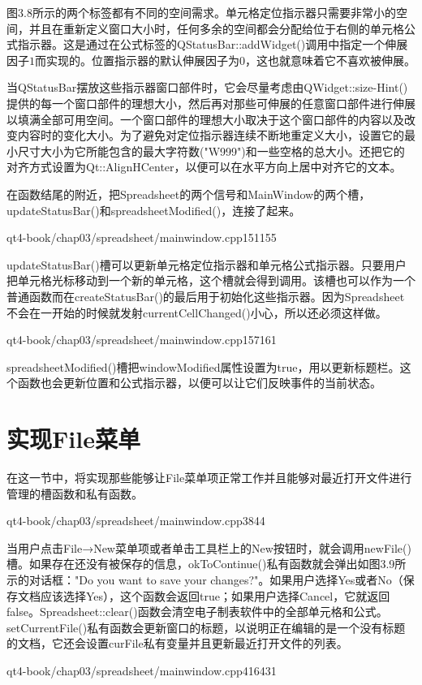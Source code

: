 \documentclass[11pt,oneside]{book}
\begin{document}
\begin{common-format}
图3.8所示的两个标签都有不同的空间需求。单元格定位指示器只需要非常小的空间，并且在重新定义窗口大小时，任何多余的空间都会分配给位于右侧的单元格公式指示器。这是通过在公式标签的QStatusBar::addWidget()调用中指定一个伸展因子$ 1 $而实现的。位置指示器的默认伸展因子为$ 0 $，这也就意味着它不喜欢被伸展。

当QStatusBar摆放这些指示器窗口部件时，它会尽量考虑由QWidget::size-Hint()提供的每一个窗口部件的理想大小，然后再对那些可伸展的任意窗口部件进行伸展以填满全部可用空间。一个窗口部件的理想大小取决于这个窗口部件的内容以及改变内容时的变化大小。为了避免对定位指示器连续不断地重定义大小，设置它的最小尺寸大小为它所能包含的最大字符数("W999")和一些空格的总大小。还把它的对齐方式设置为Qt::AlignHCenter，以便可以在水平方向上居中对齐它的文本。

在函数结尾的附近，把Spreadsheet的两个信号和MainWindow的两个槽，updateStatusBar()和spreadsheetModified()，连接了起来。
\begin{cppline}{qt4-book/chap03/spreadsheet/mainwindow.cpp}{151}{155}
\end{cppline}

updateStatusBar()槽可以更新单元格定位指示器和单元格公式指示器。只要用户把单元格光标移动到一个新的单元格，这个槽就会得到调用。该槽也可以作为一个普通函数而在createStatusBar()的最后用于初始化这些指示器。因为Spreadsheet不会在一开始的时候就发射currentCellChanged()小心，所以还必须这样做。
\begin{cppline}{qt4-book/chap03/spreadsheet/mainwindow.cpp}{157}{161}
\end{cppline}

spreadsheetModified()槽把windowModified属性设置为true，用以更新标题栏。这个函数也会更新位置和公式指示器，以便可以让它们反映事件的当前状态。

\section{实现File菜单}
在这一节中，将实现那些能够让File菜单项正常工作并且能够对最近打开文件进行管理的槽函数和私有函数。
\begin{cppline}{qt4-book/chap03/spreadsheet/mainwindow.cpp}{38}{44}
\end{cppline}

当用户点击File→New菜单项或者单击工具栏上的New按钮时，就会调用newFile()槽。如果存在还没有被保存的信息，okToContinue()私有函数就会弹出如图3.9所示的对话框："Do you want to save your changes?"。如果用户选择Yes或者No（保存文档应该选择Yes），这个函数会返回true；如果用户选择Cancel，它就返回false。Spreadsheet::clear()函数会清空电子制表软件中的全部单元格和公式。setCurrentFile()私有函数会更新窗口的标题，以说明正在编辑的是一个没有标题的文档，它还会设置curFile私有变量并且更新最近打开文件的列表。  
\begin{cppline}{qt4-book/chap03/spreadsheet/mainwindow.cpp}{416}{431}
\end{cppline}


\end{common-format}
\end{document}
